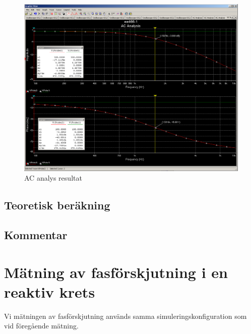 \documentclass[11pt,a4paper]{article}
\begin{document}
\begin{figure}[htbp]
    \centering
    \includegraphics[scale=0.4]{ee466multisim/5-ACanalysis.png}
    \caption{AC analys resultat}
    \label{fig:sim-5-ACanalysis-results}
\end{figure}


\subsection{Teoretisk beräkning}\label{}

\subsection{Kommentar}\label{}

\clearpage

\section{Mätning av fasförskjutning i en reaktiv krets}\label{}
Vi mätningen av fasförskjutning används samma simuleringskonfiguration som vid
föregående mätning.
\end{document}
